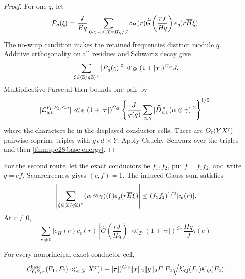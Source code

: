 \begin{proof}
For one $q$, let
\[
 \cP_q(\xi)=\frac{J}{Hq}
 \sum_{0<|r|\le X^\omega Hq/J}
 c_H(r)\widehat G\left(\frac{rJ}{Hq}\right)
 e_q(r\overline H\xi).
\]
The no-wrap condition makes the retained frequencies distinct modulo
$q$.  Additive orthogonality on all residues and Schwartz decay give
\begin{equation}
 \sum_{\xi\in(\mathbb Z/q\mathbb Z)^\times}|\mathcal P_q(\xi)|^2
 \ll_{\mathscr D}(1+|\boldsymbol\tau|)^{C_{\mathscr D}}J.
 \label{eq:tpc28-Pq-norm}
\end{equation}
Multiplicative Parseval then bounds one pair by
\begin{equation}
 |\mathcal L_{u,v}^{F_1,F_2,\le\omega}|
 \ll_{\mathscr D}(1+|\boldsymbol\tau|)^{C_{\mathscr D}}
 \left\{\frac J{\varphi(q)}
 \sum_{\alpha,\gamma}
 |\widehat D_{u,v}^{\,\times}
 (\alpha\otimes\gamma)|^2\right\}^{1/2},
 \label{eq:tpc28-pair-norm-bound}
\end{equation}
where the characters lie in the displayed conductor cells.  There are
$O_\varepsilon(YX^\varepsilon)$ pairwise-coprime triples with
$g\,c\,d\asymp Y$.
Apply Cauchy--Schwarz over the triples and then
\cref{thm:tpc28-base-energy}.
\end{proof}

For the second route, let the exact conductors be $f_1,f_2$, put
$f=f_1f_2$, and write $q=ef$.  Squarefreeness gives $(e,f)=1$.
The induced Gauss sum satisfies
\begin{equation}
 \left|\sum_{\xi\in(\mathbb Z/q\mathbb Z)^\times}
 (\alpha\otimes\gamma)(\xi)e_q(r\overline H\xi)\right|
 \le(f_1f_2)^{1/2}|c_e(r)|.
 \label{eq:tpc28-induced-Gauss}
\end{equation}
At $r\ne0$,
\begin{equation}
 \sum_{r\ne0}|c_H(r)c_e(r)|
 \left|\widehat G\left(\frac{rJ}{Hq}\right)\right|
 \ll_{\mathscr D}(1+|\boldsymbol\tau|)^{C_{\mathscr D}}
 \frac{Hq}{J}\tau(e).
 \label{eq:tpc28-Ramanujan-frequency}
\end{equation}

\begin{lemma}
\label{lem:tpc28-Gauss-route}
For every nonprincipal exact-conductor cell,
\begin{equation}
 \mathcal L^{\rm base}_{Y;S,\boldsymbol\tau}(F_1,F_2)
 \ll_{\varepsilon,\mathscr D}X^\varepsilon
 (1+|\boldsymbol\tau|)^{C_{\mathscr D}}
 \|x\|_2\|y\|_2F_1F_2
 \sqrt{\mathcal K_Q(F_1)\mathcal K_Q(F_2)}.
 \label{eq:tpc28-Gauss-route}
\end{equation}
\end{lemma}


